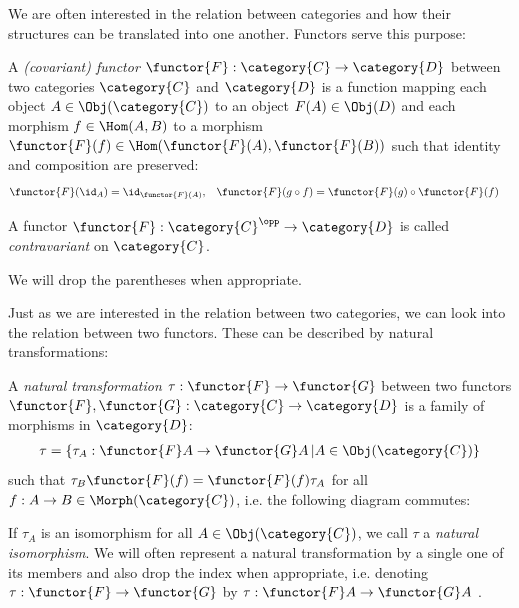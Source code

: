 \documentclass[DIN, pagenumber=false, fontsize=11pt, parskip=half, colorinlistoftodos, svgnames]{scrartcl}
\begin{document}
	We are often interested in the relation between categories and how their structures can be translated into one another. Functors serve this purpose:
	
	\begin{definition}[Functor]
		\label{def: functor}
		A \emph{(covariant) functor} $\functor{F}: \category{C} \rightarrow \category{D} $ between two categories $\category{C}$ and $\category{D} $ is a function mapping each object $A \in  \Obj(\category{C}) $ to an object $F(A) \in \Obj(D) $ and each morphism $ f \in \Hom(A,B) $ to a morphism $\functor{F}(f) \in \Hom(\functor{F}(A), \functor{F}(B))$ such that identity and composition are preserved:
		\begin{align*}
			\functor{F}(\id_A) 
			&= \id_{\functor{F}(A)},
			&
			\functor{F}(g\circ f) 
			&= \functor{F}(g) \circ \functor{F}(f)
		\end{align*}
		
		A functor $\functor{F}: \category{C}^\opp \rightarrow \category{D} $ is called \emph{contravariant} on $\category{C} $.
		
		We will drop the parentheses when appropriate.
	\end{definition}
	
	Just as we are interested in the relation between two categories, we can look into the relation between two functors. These can be described by natural transformations:
	
	\begin{definition}
		\label{def: natTrans}
		A \emph{natural transformation} $\tau: \functor{F} \rightarrow \functor{G} $ between two functors $\functor{F}, \functor{G}: \category{C} \rightarrow \category{D} $ is a family of morphisms in $\category{D}$:
		\begin{align*}
			\tau = \{ \tau_A : \functor{F}A \rightarrow \functor{G}A \,| A \in \Obj(\category{C})\}
		\end{align*}
		such that $\tau_B\functor{F}(f) = \functor{F}(f)\tau_A $ for all $f: A \rightarrow B \in \Morph(\category{C}) $, i.e. the following diagram commutes:
		
		\begin{center}
		\end{center}
		
		If $\tau_A$ is an isomorphism for all $A \in \Obj(\category{C}) $, we call $\tau$ a \emph{natural} \emph{isomorphism}.
		We will often represent a natural transformation by a single one of its members and also drop the index when appropriate, i.e. denoting 
		$\tau: \functor{F} \rightarrow \functor{G} $ 
		by 
		$\tau : \functor{F}A \rightarrow \functor{G}A $ .
	\end{definition}
	
\end{document}
